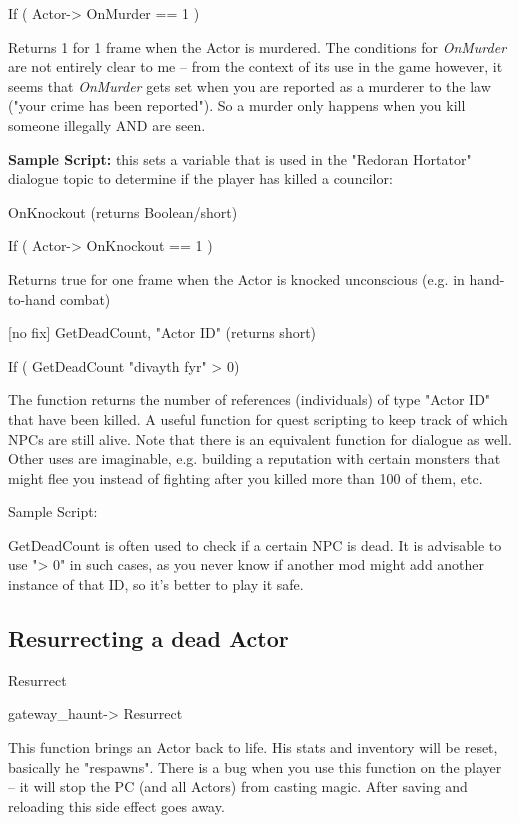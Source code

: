If ( Actor-> OnMurder == 1 )

Returns 1 for 1 frame when the Actor is murdered. The conditions for
\emph{OnMurder} are not entirely clear to me -- from the context of its
use in the game however, it seems that \emph{OnMurder} gets set when you
are reported as a murderer to the law ("your crime has been reported").
So a murder only happens when you kill someone illegally AND are seen.

\textbf{Sample Script:} this sets a variable that is used in the
"Redoran Hortator" dialogue topic to determine if the player has killed
a councilor:



OnKnockout (returns Boolean/short)

If ( Actor-> OnKnockout == 1 )

Returns true for one frame when the Actor is knocked unconscious (e.g.
in hand-to-hand combat)

{[}no fix{]} GetDeadCount, "Actor ID" (returns short)

If ( GetDeadCount "divayth fyr" > 0)

The function returns the number of references (individuals) of type
"Actor ID" that have been killed. A useful function for quest scripting
to keep track of which NPCs are still alive. Note that there is an
equivalent function for dialogue as well. Other uses are imaginable,
e.g. building a reputation with certain monsters that might flee you
instead of fighting after you killed more than 100 of them, etc.

Sample Script:

GetDeadCount is often used to check if a certain NPC is dead. It is
advisable to use "> 0" in such cases, as you never know if
another mod might add another instance of that ID, so it's better to
play it safe.



\hypertarget{resurrecting-a-dead-actor}{%
\subsection{\texorpdfstring{\hfill\break
Resurrecting a dead
Actor}{ Resurrecting a dead Actor}}\label{resurrecting-a-dead-actor}}

Resurrect

gateway\_haunt-> Resurrect

This function brings an Actor back to life. His stats and inventory will
be reset, basically he "respawns". There is a bug when you use this
function on the player -- it will stop the PC (and all Actors) from
casting magic. After saving and reloading this side effect goes away.

